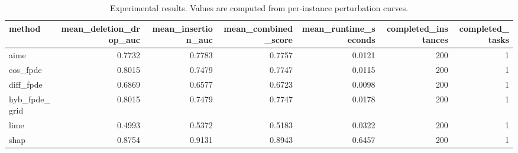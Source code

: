 \begin{table}[t]
\caption{Experimental results. Values are computed from per-instance perturbation curves.}
\label{tab:main_results_computed}
\centering
\begin{tabular}{lrrrrrr}
\toprule
method & mean\_deletion\_drop\_auc & mean\_insertion\_auc & mean\_combined\_score & mean\_runtime\_seconds & completed\_instances & completed\_tasks \\
\midrule
aime & 0.7732 & 0.7783 & 0.7757 & 0.0121 & 200 & 1 \\
cos\_fpde & 0.8015 & 0.7479 & 0.7747 & 0.0115 & 200 & 1 \\
diff\_fpde & 0.6869 & 0.6577 & 0.6723 & 0.0098 & 200 & 1 \\
hyb\_fpde\_grid & 0.8015 & 0.7479 & 0.7747 & 0.0178 & 200 & 1 \\
lime & 0.4993 & 0.5372 & 0.5183 & 0.0322 & 200 & 1 \\
shap & 0.8754 & 0.9131 & 0.8943 & 0.6457 & 200 & 1 \\
\bottomrule
\end{tabular}

\end{table}
